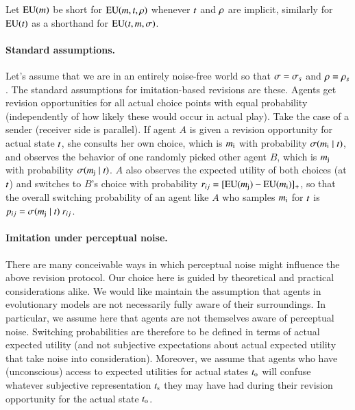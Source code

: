 \documentclass[fleqn,reqno,10pt]{article}
\begin{document}
Let $\mathrm{EU}(m)$ be short for $\mathrm{EU}(m,t,\rho)$ whenever
$t$ and $\rho$ are implicit, similarly for $\mathrm{EU}(t)$ as a
shorthand for $\mathrm{EU}(t,m,\sigma)$.

\paragraph{Standard assumptions.} Let's assume that we are in an
entirely noise-free world so that $\sigma = \sigma_s$ and $\rho =
\rho_s$. The standard assumptions for imitation-based revisions are
these. Agents get revision opportunities for all actual choice points
with equal probability (independently of how likely these would occur
in actual play). Take the case of a sender (receiver side is
parallel). If agent $A$ is given a revision opportunity for actual
state $t$, she consults her own choice, which is $m_{\mathrm{i}}$
with probability $\sigma(m_{\mathrm{i}} \mid t)$, and observes
the behavior of one randomly picked other agent $B$, which is
$m_{\mathrm{j}}$ with probability $\sigma(m_{\mathrm{j}} \mid
t)$. $A$ also observes the expected utility of both choices (at
$t$) and switches to $B$'s choice with probability $r_{ij} = [
\mathrm{EU}(m_{\mathrm{j}}) - \mathrm{EU}(m_{\mathrm{i}}) ]_+$, so that the overall
switching probability of an agent like $A$ who samples $m_{\mathrm{i}}$
for $t$ is $p_{ij} = \sigma(m_{\mathrm{j}} \mid t) \
r_{ij}$.

\paragraph{Imitation under perceptual noise.} There are many
conceivable ways in which perceptual noise might influence the above
revision protocol. Our choice here is guided by theoretical and
practical considerations alike. We would like maintain the assumption
that agents in evolutionary models are not necessarily fully aware of
their surroundings. In particular, we assume here that agents are not
themselves aware of perceptual noise. Switching probabilities are
therefore to be defined in terms of actual expected utility (and not
subjective expectations about actual expected utility that take noise
into consideration). Moreover, we assume that agents who have
(unconscious) access to expected utilities for actual states
$t_{\mathrm{o}}$ will confuse whatever subjective representation
$t_{\mathrm{s}}$ they may have had during their revision opportunity for
the actual state $t_{\mathrm{o}}$.
\end{document}
